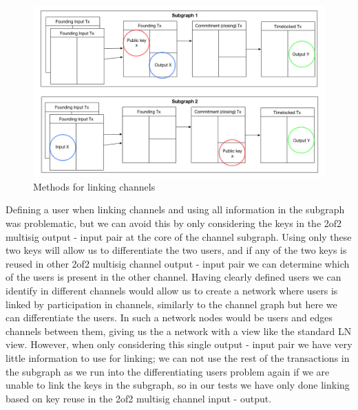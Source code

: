 \begin{figure}[h]
    \centering
    \includegraphics[width=14cm]{figures/linking_subgraphs.png}
    \caption{Methods for linking channels}
    \label{fig:linking_subgraphs}
\end{figure}


Defining a user when linking channels and using all information in the subgraph was problematic, but we can avoid this by only considering the keys in the 2of2 multisig output - input pair at the core of the channel subgraph. Using only these two keys will allow us  to differentiate the two users, and if any of the two keys is reused in other 2of2 multisig channel output - input pair we can determine which of the users is present in the other channel. Having clearly defined users we can identify in different channels would allow us to create a network where users is linked by participation in channels, similarly to the channel graph but here we can differentiate the users.
In such a network nodes would be users and edges channels between them, giving us the a network with a view like the standard LN view. However, when only considering this single output - input pair we have very little information to use for linking; we can not use the rest of the transactions in the subgraph as we run into the differentiating users problem again if we are unable to link the keys in the subgraph, so in our tests we have only done linking based on key reuse in the 2of2 multisig channel input - output. 